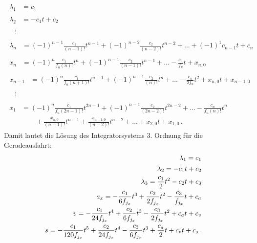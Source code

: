 \begin{align}
\begin{split}
\lambda_1 &= c_1 
\end{split}
\\
\begin{split}
\lambda_2 &= -c_1t + c_2 
\end{split}
\\
\begin{split}
&\vdots 
\end{split}
\\
\begin{split}
\lambda_n &= (-1)^{n-1}\frac{c_1}{(n-1)!}t^{n-1} + (-1)^{n-2}\frac{c_2}{(n-2)!}t^{n-2} + ... + (-1)^1c_{n-1}t + c_n 
\end{split}
\\
\begin{split}
x_n &= (-1)^n\frac{c_1}{f_u(n)!}t^{n} + (-1)^{n-1}\frac{c_2}{(n-1)!}t^{n-1} + ... - \frac{c_{n}}{f_u}t + x_{n,0} 
\end{split}
\\
\begin{split}
x_{n-1} &= (-1)^n\frac{c_1}{f_u(n+1)!}t^{n+1} + (-1)^{n-1}\frac{c_2}{(n)!}t^{n} + ... - \frac{c_{n}}{2f_u}t^2 + x_{n,0}t + x_{n-1,0} 
\end{split}
\\
\begin{split}
&\vdots 
\end{split}
\\
\begin{split}
x_{1} &= (-1)^n\frac{c_1}{f_u(2n-1)!}t^{2n-1} + (-1)^{n-1}\frac{c_2}{(2n-2)!}t^{2n-2} + ... - \frac{c_{n}}{f_u(n)!}t^n \\
&\qquad + \frac{x_{n,0}}{(n-1)!}t^{n-1} + \frac{x_{n-1,0}}{(n-2)!}t^{n-2} + ... + x_{2,0}t + x_{1,0} \,. 
\end{split}
\end{align}
Damit lautet die Lösung des Integratorsystems 3. Ordnung für die Geradeausfahrt:
\begin{align}
\begin{split}
\lambda_1 &= c_1 
\end{split}
\\
\begin{split}
\lambda_2 &= -c_1t + c_2 
\end{split}
\\
\begin{split}
\lambda_3 &= \frac{c_1}{2}t^2 - c_2t + c_3 
\end{split}
\\
\begin{split}
a_x &= -\frac{c_1}{6f_{j_x}}t^3 + \frac{c_2}{2f_{j_x}}t^2 - \frac{c_3}{f_{j_x}}t + c_a
\end{split}
\\
\begin{split}
v &= -\frac{c_1}{24f_{j_x}}t^4 + \frac{c_2}{6f_{j_x}}t^3 - \frac{c_3}{2f_{j_x}}t^2 + c_at + c_v
\end{split}
\\
\begin{split}
s &= -\frac{c_1}{120f_{j_x}}t^5 + \frac{c_2}{24f_{j_x}}t^4 - \frac{c_3}{6f_{j_x}}t^3 + \frac{c_a}{2}t + c_vt + c_s \,.
\end{split}
\end{align}
